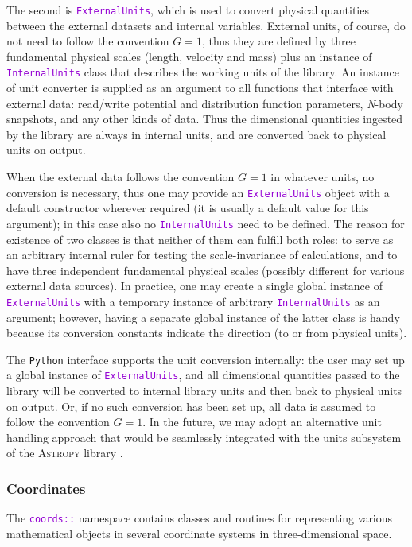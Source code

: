 \documentclass[12pt]{article}
\newcommand{\Nbody}{\textsl{N}-body\xspace}
\newcommand{\Python}{\texttt{Python}\xspace}
\newcommand{\ttt}[1]{\textcolor{darkviolet}{\texttt{#1}}}
\begin{document}
The second is \ttt{ExternalUnits}, which is used to convert physical quantities between the external datasets and internal variables. External units, of course, do not need to follow the convention $G=1$, thus they are defined by three fundamental physical scales (length, velocity and mass) plus an instance of \ttt{InternalUnits} class that describes the working units of the library. An instance of unit converter is supplied as an argument to all functions that interface with external data: read/write potential and distribution function parameters, \Nbody snapshots, and any other kinds of data. Thus the dimensional quantities ingested by the library are always in internal units, and are converted back to physical units on output.

When the external data follows the convention $G=1$ in whatever units, no conversion is necessary, thus one may provide an \ttt{ExternalUnits} object with a default constructor wherever required (it is usually a default value for this argument); in this case also no \ttt{InternalUnits} need to be defined. The reason for existence of two classes is that neither of them can fulfill both roles: to serve as an arbitrary internal ruler for testing the scale-invariance of calculations, and to have three independent fundamental physical scales (possibly different for various external data sources). In practice, one may create a single global instance of \ttt{ExternalUnits} with a temporary instance of arbitrary \ttt{InternalUnits} as an argument; however, having a separate global instance of the latter class is handy because its conversion constants indicate the direction (to or from physical units).

The \Python interface supports the unit conversion internally: the user may set up a global instance of \ttt{ExternalUnits}, and all dimensional quantities passed to the library will be converted to internal library units and then back to physical units on output. Or, if no such conversion has been set up, all data is assumed to follow the convention $G=1$. In the future, we may adopt an alternative unit handling approach that would be seamlessly integrated with the units subsystem of the \textsc{Astropy} library \cite{Astropy}.

\subsubsection{Coordinates}  \label{sec:Coords}
The \ttt{coords::} namespace contains classes and routines for representing various mathematical objects in several coordinate systems in three-dimensional space.
\end{document}
